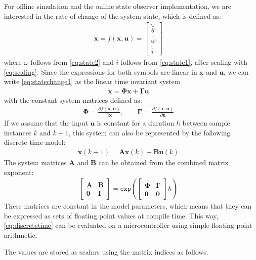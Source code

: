 \documentclass[12pt, a4paper]
{article}
\providecommand{\lr}[1]{\left(#1\right)}
\providecommand{\w}{\omega}
\renewcommand{\th}{\theta}
\providecommand{\w}{\omega}
\providecommand{\x}{\boldsymbol{x}}
\providecommand{\dx}{\dot{\boldsymbol{x}}}
\renewcommand{\u}{\boldsymbol{u}}
\providecommand{\A}{\mathbf{A}}
\providecommand{\B}{\mathbf{B}}
\providecommand{\F}{\mathbf{\Phi}}
\providecommand{\G}{\mathbf{\Gamma}}
\begin{document}
For offline simulation and the online state observer implementation, we are
interested in the rate of change of the system state, which is defined as:
%
\begin{align}
    \label{eq:statechange1}
    \dx = f(\x, \u) = \begin{bmatrix}
        \dot{\bar{\th}}\\[1em]
        \dot{\bar{\w}}\\[1em]
        \dot{\bar{i}}
    \end{bmatrix}
\end{align}
%
where $\dot{\bar{\w}}$ follows from \eqref{eq:state2} and $\dot{\bar{i}}$
follows from \eqref{eq:state1}, after scaling with \eqref{eq:scaling}. Since
the expressions for both symbols are linear in $\x$ and $\u$, we can write
\eqref{eq:statechange1} as the linear time invariant system
\begin{align}
    \dx = \F \x + \G \u
\end{align}
%
with the constant system matrices defined as:
%
\begin{align}
    \F = \frac{\partial f(\x, \u)}{\partial \x}, \qquad
    \G = \frac{\partial f(\x, \u)}{\partial \u}
\end{align}
%
If we assume that the input $\u$ is constant for a duration $h$ between sample
instances $k$ and $k+1$, this system can also be represented by the following
discrete time model:
%
\begin{align}
    \label{eq:discretetime}
    \x(k + 1) = \A \x (k) + \B \u (k)
\end{align}
%
The system matrices $\A$ and $\B$ can be obtained from the combined matrix
exponent:
%
\begin{align}
    \begin{bmatrix}
        \A & \B \\
        \mathbf{0} & \mathbf{I}
    \end{bmatrix} = \texttt{exp} \lr{
        \begin{bmatrix}
            \F & \G \\
            \mathbf{0} & \mathbf{0}
        \end{bmatrix}h
    }
\end{align}
%
These matrices are constant in the model parameters,
which means that they can be expressed as sets of floating point values at
compile time. This way, \eqref{eq:discretetime} can be evaluated on a
microcontroller using simple floating point arithmetic.

The values are stored as scalars using the matrix indices as follows:
\end{document}
